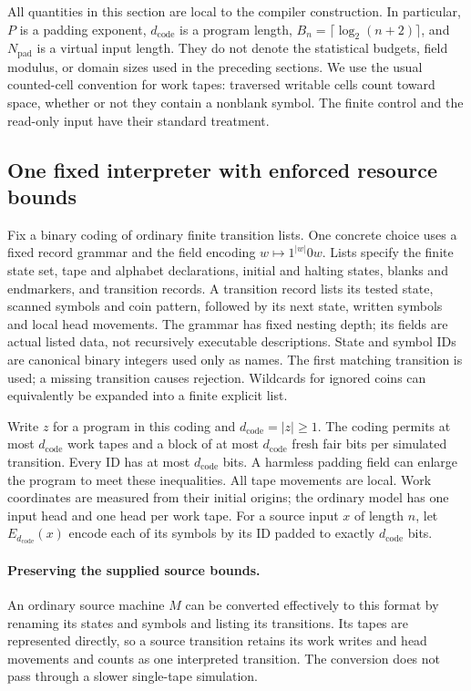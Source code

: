 All quantities in this section are local to the compiler construction.
In particular, $P$ is a padding exponent, $d_{\mathrm{code}}$ is a program
length, $B_n=\lceil\log_2(n+2)\rceil$, and $N_{\mathrm{pad}}$ is a virtual
input length.  They do not denote the statistical budgets, field modulus,
or domain sizes used in the preceding sections.  We use the usual
counted-cell convention for work tapes: traversed writable cells count
toward space, whether or not they contain a nonblank symbol.  The finite
control and the read-only input have their standard treatment.

\subsection{One fixed interpreter with enforced resource bounds}
\label{subsec:compiler-interpreter}

Fix a binary coding of ordinary finite transition lists.  One concrete
choice uses a fixed record grammar and the field encoding
$w\mapsto 1^{|w|}0w$.  Lists specify the finite state set, tape and
alphabet declarations, initial and halting states, blanks and endmarkers,
and transition records.  A transition record lists its tested state,
scanned symbols and coin pattern, followed by its next state, written
symbols and local head movements.  The grammar has fixed nesting depth;
its fields are actual listed data, not recursively executable descriptions.
State and symbol IDs are canonical binary integers used only as names.
The first matching transition is
used; a missing transition causes rejection.  Wildcards for ignored coins
can equivalently be expanded into a finite explicit list.

Write $z$ for a program in this coding and
$d_{\mathrm{code}}=|z|\ge1$.  The coding permits at most
$d_{\mathrm{code}}$ work tapes and a block of at most
$d_{\mathrm{code}}$ fresh fair bits per simulated transition.  Every ID
has at most $d_{\mathrm{code}}$ bits.  A harmless padding field can enlarge
the program to meet these inequalities.  All tape movements are local.
Work coordinates are measured from their initial origins; the ordinary
model has one input head and one head per work tape.  For a source input
$x$ of length $n$, let $E_{d_{\mathrm{code}}}(x)$ encode each of its
symbols by its ID padded to exactly $d_{\mathrm{code}}$ bits.

\paragraph{Preserving the supplied source bounds.}
An ordinary source machine $M$ can be converted effectively to this format
by renaming its states and symbols and listing its transitions.  Its tapes
are represented directly, so a source transition retains its work writes
and head movements and counts as one interpreted transition.  The
conversion does not pass through a slower single-tape simulation.

